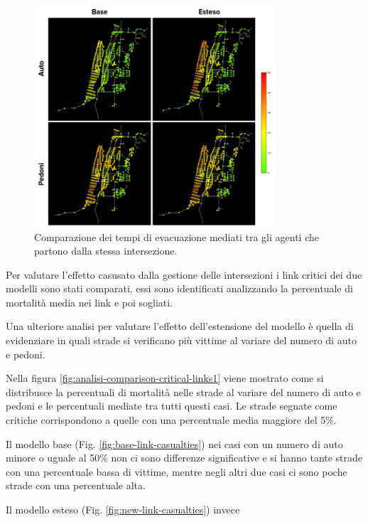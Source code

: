 \begin{figure}[ht]
    \centering
    \includegraphics[width=0.8\textwidth]{images/analisi/comparison-evtimes-map.png}
    \caption{Comparazione dei tempi di evacuazione mediati tra gli agenti che partono dalla stessa intersezione. }
    \label{fig:analisi-comparison-ev-times-map}
\end{figure}

\pagebreak

Per valutare l'effetto casusato dalla gestione delle intersezioni i link critici dei due modelli sono stati comparati,
essi sono identificati analizzando la percentuale di mortalità media nei link e poi sogliati.

Una ulteriore analisi per valutare l'effetto dell'estensione del modello è quella di evidenziare in quali strade si verificano 
più vittime al variare del numero di auto e pedoni. 

Nella figura \ref{fig:analisi-comparison-critical-links1} viene mostrato come si distribusce la percentuali di mortalità nelle strade 
al variare del numero di auto e pedoni e le percentuali mediate tra tutti questi casi. 
Le strade segnate come critiche corrispondono a quelle con una percentuale media maggiore del 5\%.

Il modello base (Fig. \ref{fig:base-link-casualties}) nei casi con un numero di auto minore o uguale al 50\%
non ci sono differenze significative e si hanno tante strade con una percentuale bassa di vittime, 
mentre negli altri due casi ci sono poche strade con una percentuale alta.

Il modello esteso (Fig. \ref{fig:new-link-casualties}) invece %


